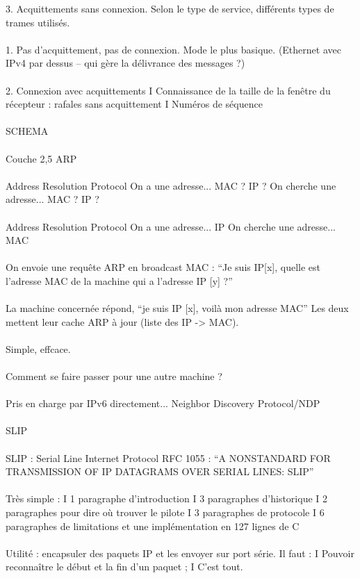 \documentclass[5pt]{article}
\begin{document}
\begin{scriptsize}
3. Acquittements sans connexion. Selon le type de service, différents types de trames utilisés.\\
\\
1. Pas d’acquittement, pas de connexion. Mode le plus basique. (Ethernet avec IPv4 par dessus – qui gère la délivrance des messages ?)\\
\\
2. Connexion avec acquittements I Connaissance de la taille de la fenêtre du récepteur : rafales sans acquittement I Numéros de séquence\\
\\SCHEMA\\
\\
Couche 2,5 ARP\\
\\
Address Resolution Protocol On a une adresse... MAC ? IP ? On cherche une adresse... MAC ? IP ?\\
\\
Address Resolution Protocol On a une adresse... IP On cherche une adresse... MAC\\
\\
On envoie une requête ARP en broadcast MAC : “Je suis IP[x], quelle est l’adresse MAC de la machine qui a l’adresse IP [y] ?”\\
\\
La machine concernée répond, “je suis IP [x], voilà mon adresse MAC” Les deux mettent leur cache ARP à jour (liste des IP -> MAC).\\
\\
Simple, effcace.\\
\\
Comment se faire passer pour une autre machine ?\\
\\
Pris en charge par IPv6 directement... Neighbor Discovery Protocol/NDP\\
\\
SLIP\\
\\
SLIP : Serial Line Internet Protocol RFC 1055 : “A NONSTANDARD FOR TRANSMISSION OF IP DATAGRAMS OVER SERIAL LINES: SLIP”\\
\\
Très simple : I 1 paragraphe d’introduction I 3 paragraphes d’historique I 2 paragraphes pour dire où trouver le pilote I 3 paragraphes de protocole I 6 paragraphes de limitations et une implémentation en 127 lignes de C\\
\\
Utilité : encapsuler des paquets IP et les envoyer sur port série. Il faut : I Pouvoir reconnaître le début et la fin d’un paquet ; I C’est tout.\\

\end{scriptsize}
\end{document}
